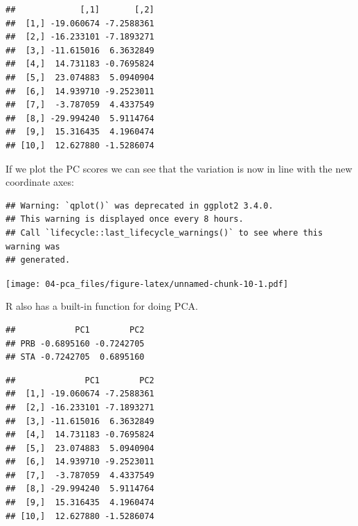\documentclass[
]{book}
\newenvironment{Shaded}{\begin{snugshade}}{\end{snugshade}}
\newcommand{\CommentTok}[1]{\textcolor[rgb]{0.56,0.35,0.01}{\textit{#1}}}
\newcommand{\DecValTok}[1]{\textcolor[rgb]{0.00,0.00,0.81}{#1}}
\newcommand{\FunctionTok}[1]{\textcolor[rgb]{0.13,0.29,0.53}{\textbf{#1}}}
\newcommand{\NormalTok}[1]{#1}
\newcommand{\OtherTok}[1]{\textcolor[rgb]{0.56,0.35,0.01}{#1}}
\newcommand{\SpecialCharTok}[1]{\textcolor[rgb]{0.81,0.36,0.00}{\textbf{#1}}}
\theoremstyle{definition}
\theoremstyle{definition}
\theoremstyle{definition}
\theoremstyle{definition}
\theoremstyle{remark}
\begin{document}
\begin{verbatim}
##             [,1]       [,2]
##  [1,] -19.060674 -7.2588361
##  [2,] -16.233101 -7.1893271
##  [3,] -11.615016  6.3632849
##  [4,]  14.731183 -0.7695824
##  [5,]  23.074883  5.0940904
##  [6,]  14.939710 -9.2523011
##  [7,]  -3.787059  4.4337549
##  [8,] -29.994240  5.9114764
##  [9,]  15.316435  4.1960474
## [10,]  12.627880 -1.5286074
\end{verbatim}

If we plot the PC scores we can see that the variation is now in line with the new coordinate axes:

\begin{verbatim}
## Warning: `qplot()` was deprecated in ggplot2 3.4.0.
## This warning is displayed once every 8 hours.
## Call `lifecycle::last_lifecycle_warnings()` to see where this warning was
## generated.
\end{verbatim}

\texttt{[image: 04-pca\_files/figure-latex/unnamed-chunk-10-1.pdf]}

R also has a built-in function for doing PCA.

\begin{Shaded}
\end{Shaded}

\begin{verbatim}
##            PC1        PC2
## PRB -0.6895160 -0.7242705
## STA -0.7242705  0.6895160
\end{verbatim}

\begin{Shaded}
\end{Shaded}

\begin{verbatim}
##              PC1        PC2
##  [1,] -19.060674 -7.2588361
##  [2,] -16.233101 -7.1893271
##  [3,] -11.615016  6.3632849
##  [4,]  14.731183 -0.7695824
##  [5,]  23.074883  5.0940904
##  [6,]  14.939710 -9.2523011
##  [7,]  -3.787059  4.4337549
##  [8,] -29.994240  5.9114764
##  [9,]  15.316435  4.1960474
## [10,]  12.627880 -1.5286074
\end{verbatim}
\end{document}
